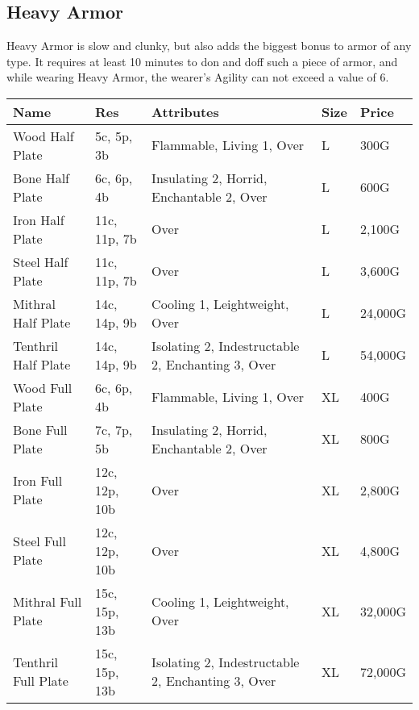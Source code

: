 \subsection{Heavy Armor}\label{subsec:heavyArmor}
Heavy Armor is slow and clunky, but also adds the biggest bonus to armor of any type.
It requires at least 10 minutes to don and doff such a piece of armor, and while wearing Heavy Armor, the wearer's Agility can not exceed a value of 6.
\begin{longtable}{p{3cm} | p{1.5cm} | p{5cm} | p{1cm} | p{1.5cm}}
	Name & Res &  Attributes & Size & Price\\ \hline
	Wood Half Plate  & 5c, 5p, 3b & Flammable, Living 1, Over & L & 300G\\
	
	Bone Half Plate  & 6c, 6p, 4b & Insulating 2, Horrid, Enchantable 2, Over & L & 600G\\
	
	Iron Half Plate  & 11c, 11p, 7b & Over & L & 2,100G\\
	
	Steel Half Plate  & 11c, 11p, 7b & Over & L & 3,600G\\
	
	Mithral Half Plate  & 14c, 14p, 9b & Cooling 1, Leightweight, Over & L & 24,000G\\
	
	Tenthril Half Plate  & 14c, 14p, 9b & Isolating 2, Indestructable 2, Enchanting 3, Over & L & 54,000G\\
	
	Wood Full Plate  & 6c, 6p, 4b & Flammable, Living 1, Over & XL & 400G\\
	
	Bone Full Plate  & 7c, 7p, 5b & Insulating 2, Horrid, Enchantable 2, Over & XL & 800G\\
	
	Iron Full Plate  & 12c, 12p, 10b & Over & XL & 2,800G\\
	
	Steel Full Plate  & 12c, 12p, 10b & Over & XL & 4,800G\\
	
	Mithral Full Plate  & 15c, 15p, 13b & Cooling 1, Leightweight, Over & XL & 32,000G\\
	
	Tenthril Full Plate  & 15c, 15p, 13b & Isolating 2, Indestructable 2, Enchanting 3, Over & XL & 72,000G\\
\end{longtable}